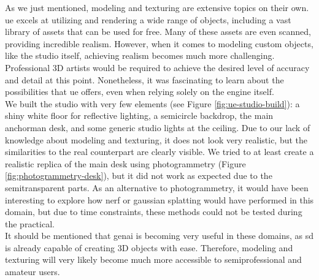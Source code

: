 \documentclass[
  a4paper,  %
  twoside,  %
  bibliography=totoc,
  headsepline,
  cleardoublepage=empty,
  parskip=half,
  draft=false
]{scrbook}
\begin{document}
As we just mentioned, modeling and texturing are extensive topics on their own. \gls{ue} excels at utilizing and rendering a wide range of objects, including a vast library of assets that can be used for free. Many of these assets are even scanned, providing incredible realism. However, when it comes to modeling custom objects, like the studio itself, achieving realism becomes much more challenging. Professional 3D artists would be required to achieve the desired level of accuracy and detail at this point. Nonetheless, it was fascinating to learn about the possibilities that \gls{ue} offers, even when relying solely on the engine itself. \\
We built the studio with very few elements (see Figure \ref{fig:ue-studio-build}): a shiny white floor for reflective lighting, a semicircle backdrop, the main anchorman desk, and some generic studio lights at the ceiling. Due to our lack of knowledge about modeling and texturing, it does not look very realistic, but the similarities to the real counterpart are clearly visible. We tried to at least create a realistic replica of the main desk using photogrammetry (Figure \ref{fig:photogrammetry-desk}), but it did not work as expected due to the semitransparent parts. As an alternative to photogrammetry, it would have been interesting to explore how \gls{nerf} or gaussian splatting would have performed in this domain, but due to time constraints, these methods could not be tested during the practical. \\
It should be mentioned that \gls{genai} is becoming very useful in these domains, as \gls{sd} is already capable of creating 3D objects with ease. Therefore, modeling and texturing will very likely become much more accessible to semiprofessional and amateur users.
\end{document}
